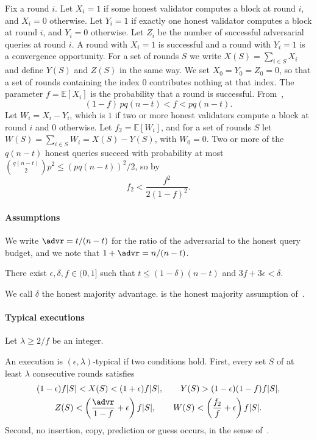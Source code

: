 Fix a round $i$. Let $X_i=1$ if some honest validator computes a block at
round $i$, and $X_i=0$ otherwise. Let $Y_i=1$ if exactly one honest validator
computes a block at round $i$, and $Y_i=0$ otherwise. Let $Z_i$ be the number
of successful adversarial queries at round $i$. A round with $X_i=1$ is successful
and a round with $Y_i=1$ is a convergence opportunity. For a set of rounds $S$ we
write $X(S)=\sum_{i\in S}X_i$ and define $Y(S)$ and $Z(S)$ in the same way. We
set $X_0=Y_0=Z_0=0$, so that a set of rounds containing the index $0$ contributes
nothing at that index. The parameter $f=\mathbb{E}[X_i]$ is the probability that
a round is successful. From~\cite[Equation~(1)]{gkl24},
\begin{equation}\label{eq.rates}
    (1-f)\,pq(n-t) < f < pq(n-t) .
\end{equation}
Let $W_i=X_i-Y_i$, which is $1$ if two or more honest validators compute a
block at round $i$ and $0$ otherwise. Let $f_2=\mathbb{E}[W_i]$, and for a set
of rounds $S$ let $W(S)=\sum_{i\in S}W_i=X(S)-Y(S)$, with $W_0=0$. Two or
more of the $q(n-t)$ honest queries succeed with probability at most
$\binom{q(n-t)}{2}p^2\le(pq(n-t))^2/2$, so by 
\[
    f_2 < \frac{f^2}{2(1-f)^2} .
\]

\paragraph{Assumptions}

We write $\advr=t/(n-t)$ for the ratio of the adversarial to the honest query
budget, and we note that $1+\advr=n/(n-t)$.

\begin{assumption}\label{asm.majority}
    There exist $\epsilon,\delta,f\in(0,1]$ such that $t\le(1-\delta)(n-t)$ and
    $3f+3\epsilon<\delta$.
\end{assumption}

We call $\delta$ the honest majority advantage.  is the
honest majority assumption of~\cite{gkl24}.

\paragraph{Typical executions}

Let $\lambda\ge2/f$ be an integer.

\begin{definition}\label{def.typical}
    An execution is $(\epsilon,\lambda)$-typical if two conditions hold.
    First, every set $S$ of at least $\lambda$ consecutive rounds satisfies
    \[
        \begin{gathered}
            (1-\epsilon)f|S| < X(S) < (1+\epsilon)f|S|,
            \qquad Y(S) > (1-\epsilon)(1-f)f|S|,\\
            Z(S) < \left(\frac{\advr}{1-f}+\epsilon\right)f|S|,
            \qquad W(S) < \left(\frac{f_2}{f}+\epsilon\right)f|S| .
        \end{gathered}
    \]
    Second, no insertion, copy, prediction or guess occurs, in the sense
    of~\cite[Definition 4.3]{gkl24}.
\end{definition}

